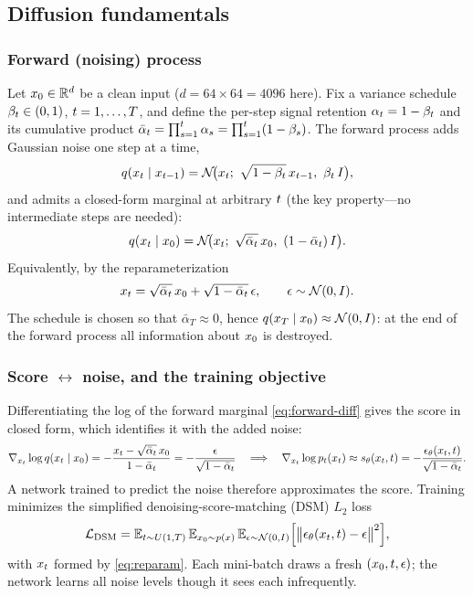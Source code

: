 \subsection{Diffusion fundamentals}\label{sec:diff-fund}

\subsubsection{Forward (noising) process}
Let $x_{0}\in\mathbb{R}^{d}$ be a clean input ($d=64\times64=4096$ here). Fix a variance
schedule $\beta_{t}\in(0,1)$, $t=1,\dots,T$, and define the per-step signal
retention $\alpha_{t}=1-\beta_{t}$ and its cumulative product
$\bar{\alpha}_{t}=\prod_{s=1}^{t}\alpha_{s}=\prod_{s=1}^{t}(1-\beta_{s})$. The forward
process adds Gaussian noise one step at a time,
\begin{equation}
q(\xt\mid x_{\dt-1})=\Gauss\!\big(\xt;\ \sqrt{1-\bsched}\,x_{\dt-1},\ \bsched\,I\big),
\label{eq:forward-step}
\end{equation}
and admits a closed-form marginal at arbitrary $t$ (the key property---no
intermediate steps are needed):
\begin{equation}
q(\xt\mid\xz)=\Gauss\!\big(\xt;\ \sqrt{\abar}\,\xz,\ (1-\abar)\,I\big).
\label{eq:forward-diff}
\end{equation}
Equivalently, by the reparameterization
\begin{equation}
x_{t}=\sqrt{\bar{\alpha}_{t}}\,x_{0}+\sqrt{1-\bar{\alpha}_{t}}\,\epsilon,\qquad \epsilon\sim\mathcal{N}(0,I).
\label{eq:reparam}
\end{equation}
The schedule is chosen so that $\bar\alpha_{T}\approx0$, hence
$q(x_{T}\mid x_{0})\approx\mathcal{N}(0,I)$: at the end of the forward process all
information about $x_{0}$ is destroyed.

\subsubsection{Score $\leftrightarrow$ noise, and the training objective}
Differentiating the log of the forward marginal \eqref{eq:forward-diff} gives the
score in closed form, which identifies it with the added noise:
\begin{equation}
\nabla_{x_{t}}\log q(x_{t}\mid x_{0})
   =-\frac{x_{t}-\sqrt{\bar{\alpha}_{t}}\,x_{0}}{1-\bar{\alpha}_{t}}
   =-\frac{\epsilon}{\sqrt{1-\bar{\alpha}_{t}}}
\quad\Longrightarrow\quad
\nabla_{x_{t}}\log p_{t}(x_{t})\approx s_{\theta}(x_{t},t)=-\frac{\epsilon_{\theta}(x_{t},t)}{\sqrt{1-\bar{\alpha}_{t}}}.
\label{eq:score-noise}
\end{equation}
A network trained to predict the noise therefore approximates the score. Training
minimizes the simplified denoising-score-matching (DSM) $L_{2}$ loss
\begin{equation}
\mathcal{L}_{\mathrm{DSM}}
  =\mathbb{E}_{t\sim U(1,T)}\,\mathbb{E}_{x_{0}\sim p(x)}\,\mathbb{E}_{\epsilon\sim\mathcal{N}(0,I)}
   \Big[\big\lVert\epsilon_{\theta}(x_{t},t)-\epsilon\big\rVert^{2}\Big],
\label{eq:dsm}
\end{equation}
with $x_{t}$ formed by \eqref{eq:reparam}. Each mini-batch draws a fresh
$(x_{0},t,\epsilon)$; the network learns all noise levels though it sees each
infrequently.

